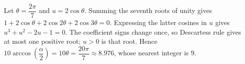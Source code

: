 Let $\theta=\dfrac{2\pi}{7}$ and $u=2\cos\theta$. Summing the seventh roots of unity gives $1+2\cos\theta+2\cos2\theta+2\cos3\theta=0$. Expressing the latter cosines in $u$ gives $u^3+u^2-2u-1=0$. The coefficient signs change once, so Descartes\textquotesingle s rule gives at most one positive root; $u>0$ is that root. Hence $10 \arccos (\dfrac{\alpha}{2}) = 10 \theta = \dfrac{20\pi}{7} \approx 8.976$, whose nearest integer is $\boxed9$.

